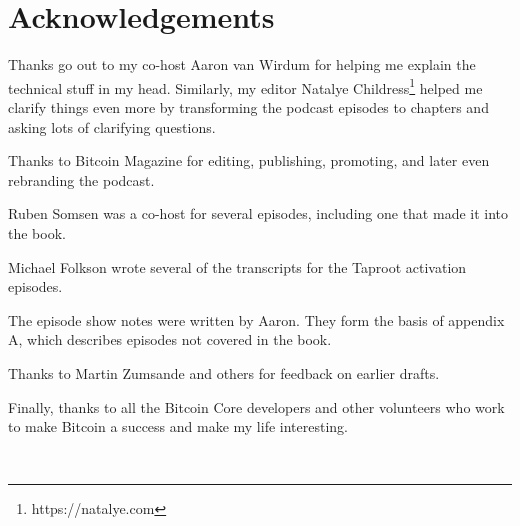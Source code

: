 \pagestyle{myheadings}
\chapter{Acknowledgements}

Thanks go out to my co-host Aaron van Wirdum for helping me explain the technical stuff in my head. Similarly, my editor Natalye Childress\footnote{https://natalye.com  } helped me clarify things even more by transforming the podcast episodes to chapters and asking lots of clarifying questions.

Thanks to Bitcoin Magazine for editing, publishing, promoting, and later even rebranding the podcast.

Ruben Somsen was a co-host for several episodes, including one that made it into the book.

Michael Folkson wrote several of the transcripts for the Taproot activation episodes.

The episode show notes were written by Aaron. They form the basis of appendix A, which describes episodes not covered in the book.

Thanks to Martin Zumsande and others for feedback on earlier drafts.

Finally, thanks to all the Bitcoin Core developers and other volunteers who work to make Bitcoin a success and make my life interesting.

\newpage

\ %

\newpage
